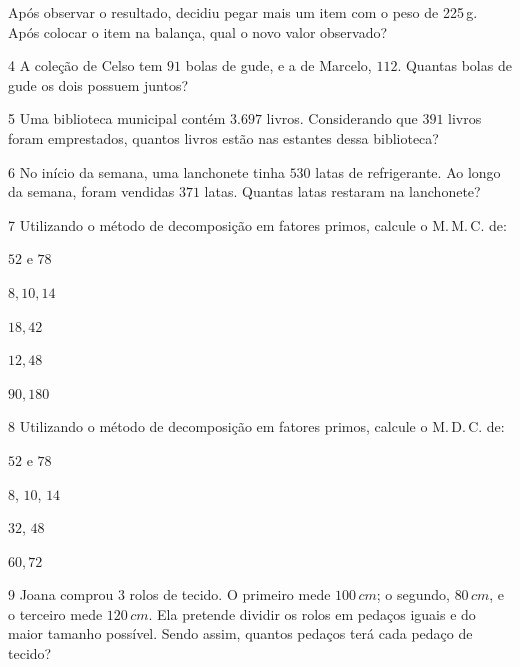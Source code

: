 Após observar o resultado, decidiu pegar mais um item com o peso de
225\,g. Após colocar o item na balança, qual o novo valor observado?


\num{4}  A coleção de Celso tem $91$ bolas de gude, e a de Marcelo, $112$. Quantas
bolas de gude os dois possuem juntos?



\num{5}  Uma biblioteca municipal contém $3.697$ livros. Considerando que $391$
livros foram emprestados, quantos livros estão nas estantes dessa
biblioteca?


\num{6}  No início da semana, uma lanchonete tinha $530$ latas de refrigerante.
Ao longo da semana, foram vendidas $371$ latas. Quantas latas restaram na
lanchonete?


\num{7}  Utilizando o método de decomposição em fatores primos, calcule o
M.\,M.\,C. de:

\begin{escolha}
\item $52$ e $78$ 
\item $8,10,14$ 
\item $18,42$ 
\item $12,48$ 
\item $90,180$ 
\end{escolha}

\num{8}  Utilizando o método de decomposição em fatores primos, calcule o
M.\,D.\,C. de:

\begin{escolha}
\item $52$ e $78$ 
\item $8$, $10$, $14$ 
\item $32$, $48$ 
\item $60,72$ 
\end{escolha}

\num{9} Joana comprou $3$ rolos de tecido. O primeiro mede $100\,cm$; o segundo,
$80\,cm$, e o terceiro mede $120\,cm$. Ela pretende dividir os rolos em
pedaços iguais e do maior tamanho possível. Sendo assim, quantos pedaços
terá cada pedaço de tecido?

